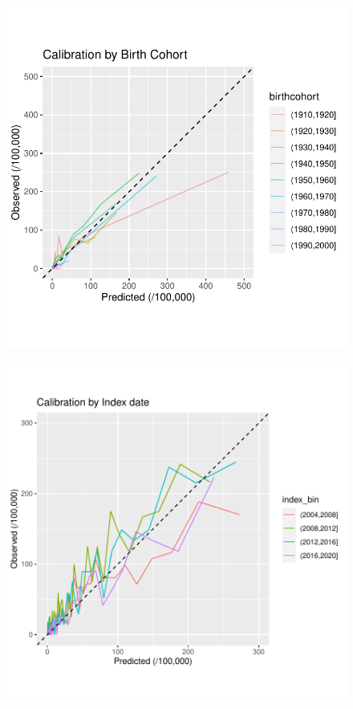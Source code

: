 \documentclass[12pt]{article}
\begin{document}
\begin{figure}[h]
\centering
\includegraphics[width=1.0\textwidth]{figures/birthyear/calibration_birthcohort_zoom.pdf}
\end{figure}

\begin{figure}[h]
\centering
\includegraphics[width=1.0\textwidth]{figures/birthyear/calibration_index_zoom.pdf}
\end{figure}
\end{document}
